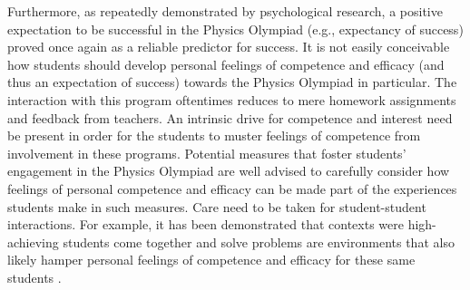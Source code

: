 \documentclass[D:/studies/WinnerS/Erhebungen/IPhO1718/paper/problem_solving/main/TaylorFrancis/interactapasample]{subfiles}
\begin{document}
Furthermore, as repeatedly demonstrated by psychological research, a positive expectation to be successful in the Physics Olympiad (e.g., expectancy of success) proved once again as a reliable predictor for success. It is not easily conceivable how students should develop personal feelings of competence and efficacy (and thus an expectation of success) towards the Physics Olympiad in particular. The interaction with this program oftentimes reduces to mere homework assignments and feedback from teachers. An intrinsic drive for competence and interest need be present in order for the students to muster feelings of competence from involvement in these programs. Potential measures that foster students' engagement in the Physics Olympiad are well advised to carefully consider how feelings of personal competence and efficacy can be made part of the experiences students make in such measures. Care need to be taken for student-student interactions. For example, it has been demonstrated that contexts were high-achieving students come together and solve problems are environments that also likely hamper personal feelings of competence and efficacy for these same students \citep{Marsh.1995}. 
\end{document}
